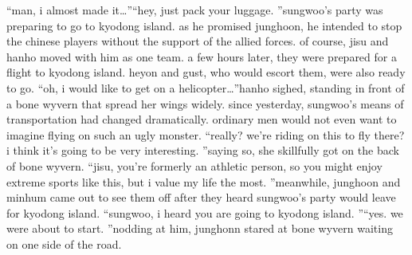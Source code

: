“man, i almost made it…”“hey, just pack your luggage.
”sungwoo’s party was preparing to go to kyodong island.
 as he promised junghoon, he intended to stop the chinese players without the support of the allied forces.
of course, jisu and hanho moved with him as one team.
a few hours later, they were prepared for a flight to kyodong island.
 heyon and gust, who would escort them, were also ready to go.
“oh, i would like to get on a helicopter…”hanho sighed, standing in front of a bone wyvern that spread her wings widely.
since yesterday, sungwoo’s means of transportation had changed dramatically.
ordinary men would not even want to imagine flying on such an ugly monster.
“really? we’re riding on this to fly there? i think it’s going to be very interesting.
”saying so, she skillfully got on the back of bone wyvern.
“jisu, you’re formerly an athletic person, so you might enjoy extreme sports like this, but i value my life the most.
”meanwhile, junghoon and minhum came out to see them off after they heard sungwoo’s party would leave for kyodong island.
“sungwoo, i heard you are going to kyodong island.
”“yes.
 we were about to start.
”nodding at him, junghonn stared at bone wyvern waiting on one side of the road.

